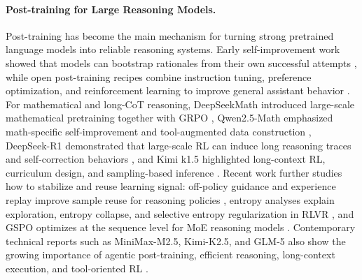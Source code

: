 \documentclass{llmxive}
\begin{document}
\paragraph{Post-training for Large Reasoning Models.}
Post-training has become the main mechanism for turning strong pretrained
language models into reliable reasoning systems. Early self-improvement work
showed that models can bootstrap rationales from their own successful attempts
\citep{zelikman2022star}, while open post-training recipes combine instruction
tuning, preference optimization, and reinforcement learning to improve general
assistant behavior \citep{lambert2024tulu}. For mathematical and long-CoT
reasoning, DeepSeekMath introduced large-scale mathematical pretraining together
with GRPO \citep{shao2024deepseekmath}, Qwen2.5-Math emphasized math-specific
self-improvement and tool-augmented data construction
\citep{yang2024qwen25math}, DeepSeek-R1 demonstrated that large-scale RL can
induce long reasoning traces and self-correction behaviors \citep{r1}, and Kimi
k1.5 highlighted long-context RL, curriculum design, and sampling-based
inference \citep{kimi2025k15}. Recent work further studies how to stabilize and
reuse learning signal: off-policy guidance and experience replay improve sample
reuse for reasoning policies \citep{yan2025learning,exgrpo}, entropy analyses
explain exploration, entropy collapse, and selective entropy regularization in
RLVR \citep{cui2025entropy,jiang2025rethinkingentropy}, and GSPO optimizes at
the sequence level for MoE reasoning models \citep{zheng2025gspo}. Contemporary
technical reports such as MiniMax-M2.5, Kimi-K2.5, and GLM-5 also show the
growing importance of agentic post-training, efficient reasoning, long-context
execution, and tool-oriented RL \citep{minimax2026m25,moonshot2026kimi25,zai2026glm5}.
\end{document}
